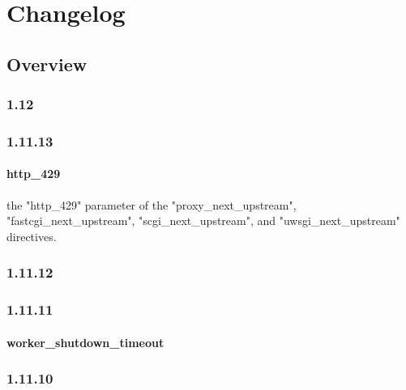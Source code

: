 \part{Changelog}


\chapter{Overview}


\section{1.12}


\section{1.11.13}

\subsection{http\_429}



the "http\_429" parameter of the "proxy\_next\_upstream",  "fastcgi\_next\_upstream", "scgi\_next\_upstream", and "uwsgi\_next\_upstream" directives.

\section{1.11.12}


\section{1.11.11}


\subsection{worker\_shutdown\_timeout}


\section{1.11.10}








